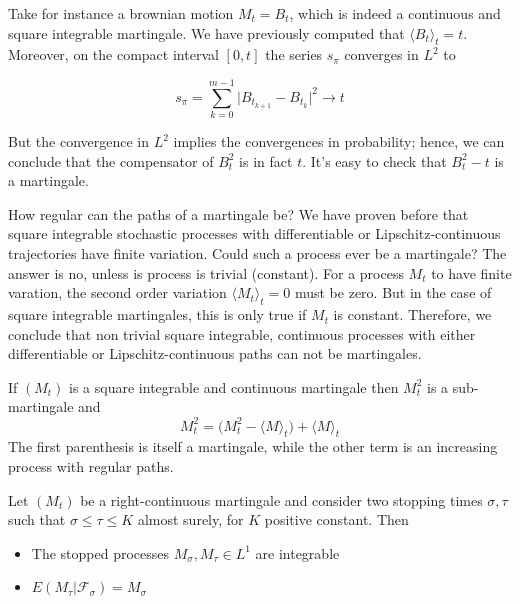Take for instance a brownian motion $M_t = B_t$, which is indeed a continuous and square integrable martingale. We have previously computed that $\langle B_t \rangle_t = t$. Moreover, on the compact interval $[0,t]$ the series $s_{\pi}$ converges in $L^2$ to

\begin{equation*}
    s_{\pi} = \sum_{k=0}^{m-1} \vert B_{t_{k+1}}-B_{t_k} \vert^2 \to t 
\end{equation*}

But the convergence in $L^2$ implies the convergences in probability; hence, we can conclude that the compensator of $B_t^2$ is in fact $t$. It's easy to check that $B_t^2-t$ is a martingale. 

How regular can the paths of a martingale be? We have proven before that square integrable stochastic processes with differentiable or Lipschitz-continuous trajectories have finite variation. Could such a process ever be a martingale? The answer is no, unless is process is trivial (constant). For a process $M_t$ to have finite varation, the second order variation $\langle M_t \rangle_t = 0$ must be zero. But in the case of square integrable martingales, this is only true if $M_t$ is constant. Therefore, we conclude that non trivial square integrable, continuous processes with either differentiable or Lipschitz-continuous paths can not be martingales.

\begin{proposition}
    If $(M_t)$ is a square integrable and continuous martingale then $M_t^2$ is a sub-martingale and 
    \begin{equation}
        M_t^2 = \big(M_t^2-\langle M \rangle_t\big) + \langle M \rangle_t
    \end{equation}
    The first parenthesis is itself a martingale, while the other term is an increasing process with regular paths. 
\end{proposition}

\begin{theorem}
Let $(M_t)$ be a right-continuous martingale and consider two stopping times $\sigma,\tau$ such that $\sigma \leq \tau \leq K$ almost surely, for $K$ positive constant. Then
\begin{itemize}
    \item The stopped processes $M_{\sigma},M_{\tau} \in L^1$ are integrable  
    \item $E(M_{\tau} \vert \mathcal{F}_{\sigma}) = M_{\sigma}$
\end{itemize}
\end{theorem}

